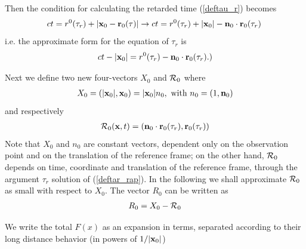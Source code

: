 Then the condition for calculating the retarded time (\ref{deftau_r}) becomes
\begin{align}
    ct= r^0(\tau_r)+|{\bf x}_0-{\bf r}_0(\tau)|\rightarrow ct = r^0(\tau_r) + |{\bf x}_0| -{\bf n}_0\cdot{\bf r}_0(\tau_r)\,
\end{align}
i.e. the approximate form for the equation of $\tau_r$ is
\begin{align}
    ct-|{\bf x}_0| = r^0(\tau_r)-{\bf n}_0\cdot{\bf r}_0(\tau_r).\label{deftar_rap})
\end{align}


Next we define two new four-vectors $X_0$ and ${\cal R}_0$ where
\begin{align}
    X_0 = (|{\bf x}_0|, {\bf x}_0) = |{\bf x}_0| n_0, \text{  with   } n_0=(1,{\bf n}_0)
\end{align}
and respectively
\begin{align}
    {\cal R}_0({\bf x}, t) = ({\bf n}_0 \cdot {\bf r}_0(\tau_r), {\bf r}_0(\tau_r))
\end{align}
Note that $X_0$ and $n_0$ are constant vectors, dependent only on the observation point and on the translation of the reference frame; on the other hand, ${\cal R}_0$ depends on time, coordinate and translation of the reference frame, through the argument $\tau_r$ solution of (\ref{deftar_rap}). In the following we shall approximate ${\cal R}_0$ as small  with respect to $X_0$. The vector $R_0$ can be written as
\begin{align}
    R_0 = X_0-{\cal R}_0
\end{align}


We write the  total $F(x)$ as an expansion in terms, separated according to their long distance behavior (in powers of $1/|{\bf x}_0|$)

